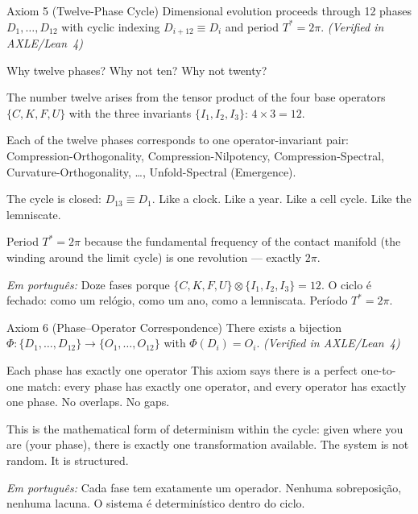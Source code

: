 \documentclass[12pt, openright]{book}
\theoremstyle{definition}
\theoremstyle{remark}
\begin{document}
\begin{formalbox}{Axiom 5 (Twelve-Phase Cycle)}
Dimensional evolution proceeds through 12 phases $D_1, \ldots, D_{12}$
with cyclic indexing $D_{i+12} \equiv D_i$ and period $T^* = 2\pi$.
\hfill\textit{(Verified in AXLE/Lean~4)}
\end{formalbox}

\begin{studentbox}{Why twelve phases?}
Why not ten? Why not twenty?

The number twelve arises from the tensor product of the
four base operators $\{C, K, F, U\}$ with the three invariants
$\{I_1, I_2, I_3\}$: $4 \times 3 = 12$.

Each of the twelve phases corresponds to one operator-invariant pair:
Compression-Orthogonality, Compression-Nilpotency,
Compression-Spectral, Curvature-Orthogonality, \ldots,
Unfold-Spectral (Emergence).

The cycle is closed: $D_{13} \equiv D_1$. Like a clock.
Like a year. Like a cell cycle. Like the lemniscate.

Period $T^* = 2\pi$ because the fundamental frequency of
the contact manifold (the winding around the limit cycle)
is one revolution --- exactly $2\pi$.

\textit{Em português:}
Doze fases porque $\{C,K,F,U\} \otimes \{I_1,I_2,I_3\} = 12$.
O ciclo é fechado: como um relógio, como um ano, como a lemniscata.
Período $T^* = 2\pi$.
\end{studentbox}

\begin{formalbox}{Axiom 6 (Phase--Operator Correspondence)}
There exists a bijection $\Phi : \{D_1,\ldots,D_{12}\} \to
\{O_1,\ldots,O_{12}\}$ with $\Phi(D_i) = O_i$.
\hfill\textit{(Verified in AXLE/Lean~4)}
\end{formalbox}

\begin{studentbox}{Each phase has exactly one operator}
This axiom says there is a perfect one-to-one match:
every phase has exactly one operator, and every operator
has exactly one phase. No overlaps. No gaps.

This is the mathematical form of determinism within the cycle:
given where you are (your phase), there is exactly one
transformation available. The system is not random. It is structured.

\textit{Em português:}
Cada fase tem exatamente um operador. Nenhuma sobreposição,
nenhuma lacuna. O sistema é determinístico dentro do ciclo.
\end{studentbox}
\end{document}
